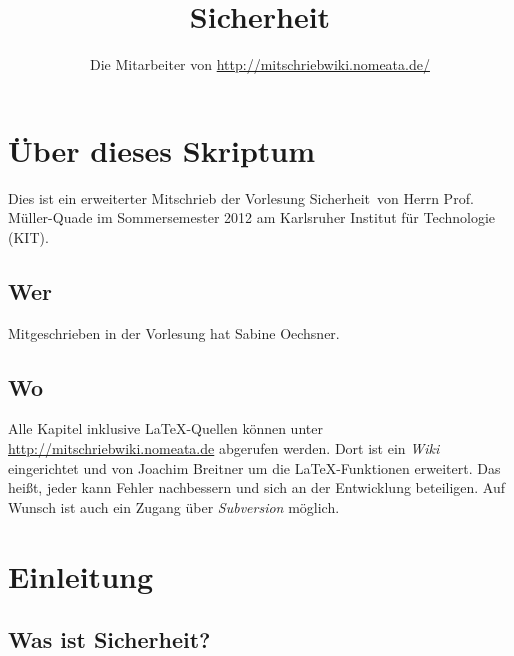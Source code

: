 \documentclass[a4paper,twoside,DIV15,BCOR12mm]{scrbook}
\author{Die Mitarbeiter von \url{http://mitschriebwiki.nomeata.de/}}
\title{Sicherheit}
\begin{document}
\maketitle

\graphicspath{{./graphics/}}

\renewcommand{\thechapter}{\Roman{chapter}}
\tableofcontents


\chapter{Über dieses Skriptum}
Dies ist ein erweiterter Mitschrieb der Vorlesung \glqq Sicherheit\grqq\ von Herrn Prof. Müller-Quade im
Sommersemester 2012 am Karlsruher Institut für Technologie (KIT).

\section{Wer}
Mitgeschrieben in der Vorlesung hat Sabine Oechsner.

\section{Wo}
Alle Kapitel inklusive \LaTeX-Quellen können unter \url{http://mitschriebwiki.nomeata.de} abgerufen werden.
Dort ist ein \emph{Wiki} eingerichtet und von Joachim Breitner um die \LaTeX-Funktionen erweitert.
Das heißt, jeder kann Fehler nachbessern und sich an der Entwicklung
beteiligen. Auf Wunsch ist auch ein Zugang über \emph{Subversion} möglich.




\chapter{Einleitung}

\section{Was ist Sicherheit?}
\end{document}
